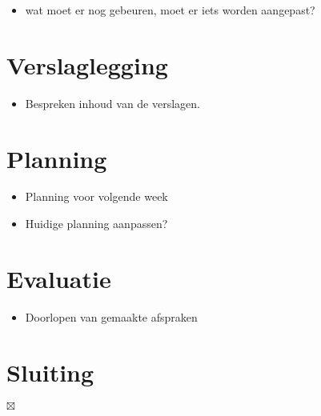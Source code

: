 \documentclass[]{article}
\begin{document}
  \begin{itemize}
    \item wat moet er nog gebeuren, moet er iets worden aangepast?
  \end{itemize}

\section{Verslaglegging}

  \begin{itemize}
    \item Bespreken inhoud van de verslagen.
  \end{itemize}

\section{Planning}
  \begin{itemize}
    \item Planning voor volgende week
    \item Huidige planning aanpassen?
  \end{itemize}

\section{Evaluatie}
  \begin{itemize}
    \item Doorlopen van gemaakte afspraken
  \end{itemize}

\section{Sluiting}

$\boxtimes$
\end{document}
